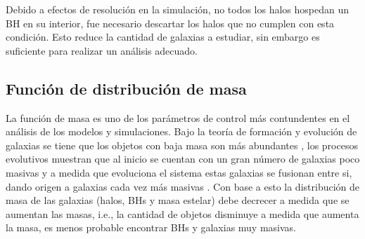Debido a efectos de resolución en la simulación, no todos los halos hospedan un BH en su interior, fue necesario descartar los halos que no cumplen con esta condición. Esto reduce  la cantidad de galaxias a estudiar, sin embargo es suficiente para realizar un análisis adecuado.

    \subsection{ Función de distribución de masa}
    \label{subsec: funcion de masa}
La función de masa es uno de los parámetros de control más contundentes en el análisis de los modelos y simulaciones. Bajo la teoría de formación y evolución de galaxias se tiene que los objetos con baja masa son más abundantes \cite{li2009}, los procesos evolutivos muestran que al inicio se cuentan con un gran número de galaxias poco masivas y a medida que evoluciona el sistema estas galaxias se fusionan entre si, dando origen a galaxias cada vez más masivas \cite{schneider2006}. 
Con base a esto la distribución de masa de las galaxias (halos, BHs y masa estelar) debe decrecer a medida que se aumentan las masas, i.e., la cantidad de objetos disminuye a medida que aumenta la masa, es menos probable encontrar BHs y galaxias muy masivas.
%
